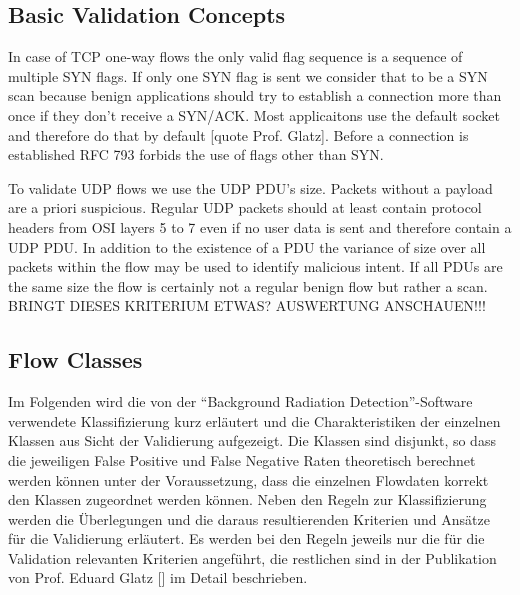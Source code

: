 \documentclass[a4paper]{scrartcl}
\begin{document}
\subsection{Basic Validation Concepts}
In case of TCP one-way flows the only valid flag sequence is a sequence of multiple SYN flags. If only one SYN flag is sent we consider that to be a SYN scan because benign applications should try to establish a connection more than once if they don't receive a SYN/ACK. Most applicaitons use the default socket and therefore do that by default [quote Prof. Glatz]. Before a connection is established RFC 793 \cite{rfc_tcp} forbids the use of flags other than SYN. 

To validate UDP flows we use the UDP PDU's size. Packets without a payload are a priori suspicious. Regular UDP packets should at least contain protocol headers from OSI layers 5 to 7 even if no user data is sent and therefore contain a UDP PDU.
In addition to the existence of a PDU the variance of size over all packets within the flow may be used to identify malicious intent. If all PDUs are the same size the flow is certainly not a regular benign flow but rather a scan. BRINGT DIESES KRITERIUM ETWAS? AUSWERTUNG ANSCHAUEN!!!

\subsection{Flow Classes}
Im Folgenden wird die von der ``Background Radiation Detection''-Software verwendete Klassifizierung kurz erläutert und die Charakteristiken der einzelnen Klassen aus Sicht der Validierung aufgezeigt. Die Klassen sind disjunkt, so dass die jeweiligen False Positive und False Negative Raten theoretisch berechnet werden können unter der Voraussetzung, dass die einzelnen Flowdaten korrekt den Klassen zugeordnet werden können. Neben den Regeln zur Klassifizierung werden die Überlegungen und die daraus resultierenden Kriterien und Ansätze für die Validierung erläutert. Es werden bei den Regeln jeweils nur die für die Validation relevanten Kriterien angeführt, die restlichen sind in der Publikation von Prof. Eduard Glatz [] im Detail beschrieben.
\end{document}
